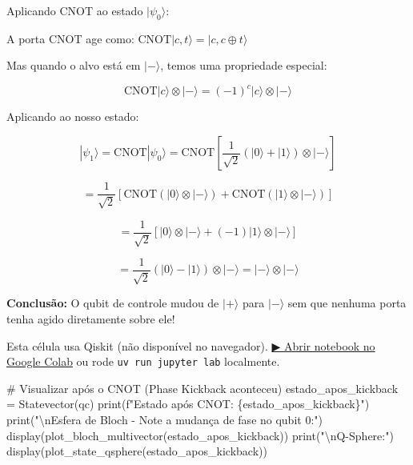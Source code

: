 \documentclass[
  brazilian,
]{report}
\newenvironment{Shaded}{\begin{snugshade}}{\end{snugshade}}
\newcommand{\BuiltInTok}[1]{\textcolor[rgb]{0.00,0.23,0.31}{#1}}
\newcommand{\CharTok}[1]{\textcolor[rgb]{0.13,0.47,0.30}{#1}}
\newcommand{\CommentTok}[1]{\textcolor[rgb]{0.37,0.37,0.37}{#1}}
\newcommand{\NormalTok}[1]{\textcolor[rgb]{0.00,0.23,0.31}{#1}}
\newcommand{\OperatorTok}[1]{\textcolor[rgb]{0.37,0.37,0.37}{#1}}
\newcommand{\SpecialCharTok}[1]{\textcolor[rgb]{0.37,0.37,0.37}{#1}}
\newcommand{\SpecialStringTok}[1]{\textcolor[rgb]{0.13,0.47,0.30}{#1}}
\newcommand{\StringTok}[1]{\textcolor[rgb]{0.13,0.47,0.30}{#1}}
\begin{document}
Aplicando CNOT ao estado \(|\psi_0\rangle\):

A porta CNOT age como:
\(\text{CNOT}|c,t\rangle = |c, c \oplus t\rangle\)

Mas quando o alvo está em \(|-\rangle\), temos uma propriedade especial:

\[\text{CNOT}|c\rangle \otimes |-\rangle = (-1)^c |c\rangle \otimes |-\rangle\]

Aplicando ao nosso estado:

\[|\psi_1\rangle = \text{CNOT}|\psi_0\rangle = \text{CNOT}\left[\frac{1}{\sqrt{2}}(|0\rangle + |1\rangle) \otimes |-\rangle\right]\]

\[= \frac{1}{\sqrt{2}}[\text{CNOT}(|0\rangle \otimes |-\rangle) + \text{CNOT}(|1\rangle \otimes |-\rangle)]\]

\[= \frac{1}{\sqrt{2}}[|0\rangle \otimes |-\rangle + (-1)|1\rangle \otimes |-\rangle]\]

\[= \frac{1}{\sqrt{2}}(|0\rangle - |1\rangle) \otimes |-\rangle = |-\rangle \otimes |-\rangle\]

\textbf{Conclusão:} O qubit de controle mudou de \(|+\rangle\) para
\(|-\rangle\) sem que nenhuma porta tenha agido diretamente sobre ele!

\begin{tcolorbox}[enhanced jigsaw, arc=.35mm, bottomrule=.15mm, bottomtitle=1mm, breakable, colback=white, colbacktitle=quarto-callout-warning-color!10!white, colframe=quarto-callout-warning-color-frame, coltitle=black, left=2mm, leftrule=.75mm, opacityback=0, opacitybacktitle=0.6, rightrule=.15mm, title=\textcolor{quarto-callout-warning-color}{\faExclamationTriangle}\hspace{0.5em}{⚛️ Célula Qiskit --- execute no Colab ou localmente}, titlerule=0mm, toprule=.15mm, toptitle=1mm]

Esta célula usa Qiskit (não disponível no navegador).
\href{https://colab.research.google.com/github/maxwellamaral/aula-quantum/blob/main/notebooks/05-interference.ipynb}{▶
Abrir notebook no Google Colab} ou rode \texttt{uv\ run\ jupyter\ lab}
localmente.

\begin{Shaded}
\begin{Highlighting}[]

\CommentTok{\# Visualizar após o CNOT (Phase Kickback aconteceu)}
\NormalTok{estado\_apos\_kickback }\OperatorTok{=}\NormalTok{ Statevector(qc)}
\BuiltInTok{print}\NormalTok{(}\SpecialStringTok{f"Estado após CNOT: }\SpecialCharTok{\{}\NormalTok{estado\_apos\_kickback}\SpecialCharTok{\}}\SpecialStringTok{"}\NormalTok{)}
\BuiltInTok{print}\NormalTok{(}\StringTok{"}\CharTok{\textbackslash{}n}\StringTok{Esfera de Bloch {-} Note a mudança de fase no qubit 0:"}\NormalTok{)}
\NormalTok{display(plot\_bloch\_multivector(estado\_apos\_kickback))}
\BuiltInTok{print}\NormalTok{(}\StringTok{"}\CharTok{\textbackslash{}n}\StringTok{Q{-}Sphere:"}\NormalTok{)}
\NormalTok{display(plot\_state\_qsphere(estado\_apos\_kickback))}
\end{Highlighting}
\end{Shaded}

\end{tcolorbox}
\end{document}
